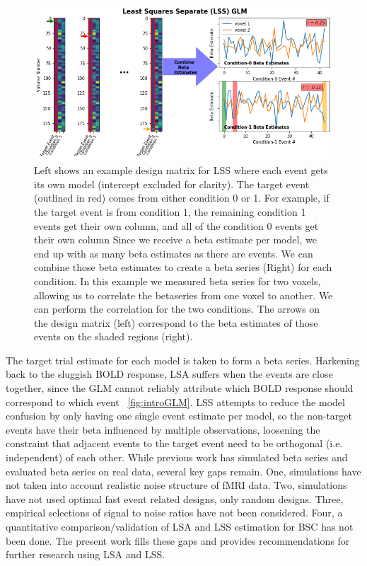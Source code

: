 \documentclass[10pt,letterpaper]{article}
\begin{document}
\begin{figure}[H]
  \centering
  \includegraphics[width=\textwidth]{introduction-lss}
  \caption{
    Left shows an example design matrix for LSS where each event gets its own model
    (intercept excluded for clarity).
    The target event (outlined in red) comes from either condition 0 or 1.
    For example, if the target event is from condition 1, the remaining condition 1 events
    get their own column, and all of the condition 0 events get their own column
    Since we receive a beta estimate per model, we end up with as many beta estimates as there
    are events.
    We can combine those beta estimates to create a beta series (Right) for each condition.
    In this example we measured beta series for two voxels, allowing us to
    correlate the betaseries from one voxel to another.
    We can perform the correlation for the two conditions.
    The arrows on the design matrix (left) correspond to the beta estimates of those events
    on the shaded regions (right).
  }
  \label{fig:introlss}
\end{figure}

The target trial estimate for each model is taken to form a beta series.
Harkening back to the sluggish BOLD response, LSA suffers when the events are close together,
since the GLM cannot reliably attribute which BOLD response should correspond to which event ~\ref{fig:introGLM}.
LSS attempts to reduce the model confusion by only having one single event estimate per model,
so the non-target events have their beta influenced by multiple observations, loosening the
constraint that adjacent events to the target event need to be orthogonal (i.e. independent) of each other.
While previous work has simulated beta series and evaluated beta series on real data,
several key gaps remain.
One, simulations have not taken into account realistic noise structure of fMRI data.
Two, simulations have not used optimal fast event related designs, only random designs. 
Three, empirical selections of signal to noise ratios have not been considered.
Four, a quantitative comparison/validation of LSA and LSS estimation for BSC has not been done.
The present work fills these gaps and provides recommendations for further research
using LSA and LSS.
\end{document}
